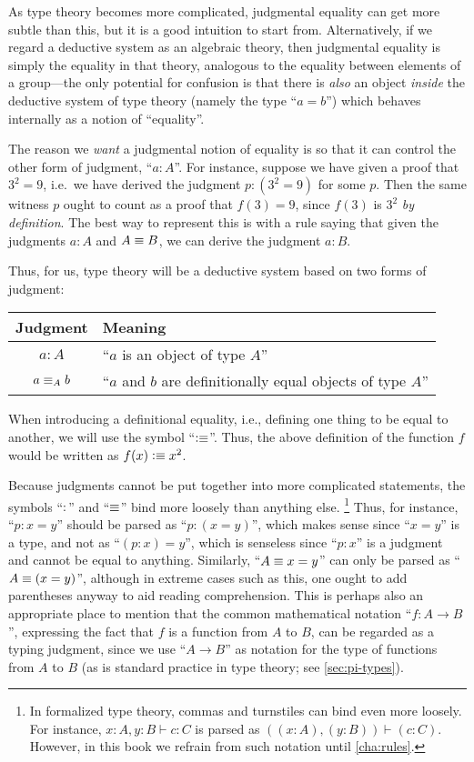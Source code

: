 As type theory becomes more complicated, judgmental equality can get more subtle than this, but it is a good intuition to start from.
Alternatively, if we regard a deductive system as an algebraic theory, then judgmental equality is simply the equality in that theory, analogous to the equality between elements of a group---the only potential for confusion is that there is \emph{also} an object \emph{inside} the deductive system of type theory (namely the type ``$a=b$'') which behaves internally as a notion of ``equality''.

The reason we \emph{want} a judgmental notion of equality is so that it can control the other form of judgment, ``$a:A$''.
For instance, suppose we have given a proof that $3^2=9$, i.e.\ we have derived the judgment $p:(3^2=9)$ for some $p$.
Then the same witness $p$ ought to count as a proof that $f(3)=9$, since $f(3)$ is $3^2$ \emph{by definition}.
The best way to represent this is with a rule saying that given the judgments $a:A$ and $A\equiv B$, we can derive the judgment $a:B$.

Thus, for us, type theory will be a deductive system based on two forms of judgment:
\begin{center}
\medskip
\begin{tabular}{cl}
  \toprule
  Judgment & Meaning\\
  \midrule
  $a : A$       & ``$a$ is an object of type $A$''\\
  $a \equiv_A b$ & ``$a$ and $b$ are definitionally equal objects of type $A$''\\
  \bottomrule
\end{tabular}
\medskip
\end{center}
%
%
When introducing a definitional equality, i.e., defining one thing to be equal to another, we will use the symbol ``$\vcentcolon\equiv$''.
Thus, the above definition of the function $f$ would be written as $f(x)\vcentcolon\equiv x^2$.

Because judgments cannot be put together into more complicated statements, the symbols ``$:$'' and ``$\equiv$'' bind more loosely than anything else.%
\footnote{In formalized type theory, commas and turnstiles can bind even more loosely.
  For instance, $x:A,y:B\vdash c:C$ is parsed as $((x:A),(y:B))\vdash (c:C)$.
  However, in this book we refrain from such notation until \autoref{cha:rules}.}
Thus, for instance, ``$p:x=y$'' should be parsed as ``$p:(x=y)$'', which makes sense since ``$x=y$'' is a type, and not as ``$(p:x)=y$'', which is senseless since ``$p:x$'' is a judgment and cannot be equal to anything.
Similarly, ``$A\equiv x=y$'' can only be parsed as ``$A\equiv(x=y)$'', although in extreme cases such as this, one ought to add parentheses anyway to aid reading comprehension.
This is perhaps also an appropriate place to mention that the common mathematical notation ``$f:A\to B$'', expressing the fact that $f$ is a function from $A$ to $B$, can be regarded as a typing judgment, since we use ``$A\to B$'' as notation for the type of functions from $A$ to $B$ (as is standard practice in type theory; see \autoref{sec:pi-types}).

